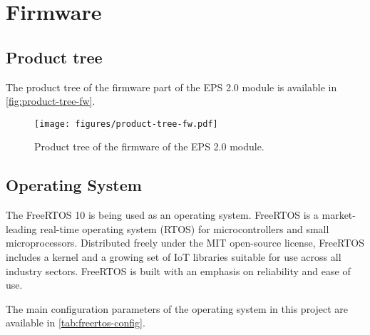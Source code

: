 %
%
%
%
%

%
%
%
%
%

\chapter{Firmware} \label{ch:firmware}

\section{Product tree}

The product tree of the firmware part of the EPS 2.0 module is available in \autoref{fig:product-tree-fw}.

\begin{figure}[!ht]
    \begin{center}
        \texttt{[image: figures/product-tree-fw.pdf]}
        \caption{Product tree of the firmware of the EPS 2.0 module.}
        \label{fig:product-tree-fw}
    \end{center}
\end{figure}


\section{Operating System}

The FreeRTOS 10 \cite{freertos} is being used as an operating system. FreeRTOS is a market-leading real-time operating system (RTOS) for microcontrollers and small microprocessors. Distributed freely under the MIT open-source license, FreeRTOS includes a kernel and a growing set of IoT libraries suitable for use across all industry sectors. FreeRTOS is built with an emphasis on reliability and ease of use.

The main configuration parameters of the operating system in this project are available in \autoref{tab:freertos-config}.

